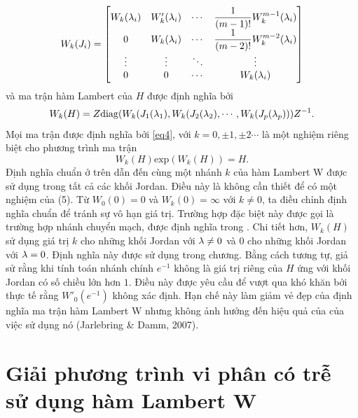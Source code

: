 \begin{equation}\label{eq3}
	W_k(J_i)= \begin{bmatrix}
		W_k(\lambda_i)  & W'_k(\lambda_i) & \cdots & \dfrac{1}{(m-1)!} W_k ^{m-1}(\lambda_i)\\
		0 & W_k(\lambda_i) & \cdots & \dfrac{1}{(m-2)!} W_k ^{m-2}(\lambda_i)\\
		\vdots  & \vdots  & \ddots & \vdots  \\
		0 & 0 & \cdots & W_k(\lambda_i)
	\end{bmatrix} 
\end{equation}
và ma trận hàm Lambert của $H$ được định nghĩa bởi
\begin{equation}\label{eq4}
	W_k(H)= Z \mathrm{diag} (W_k(J_1(\lambda_1),W_k(J_2(\lambda_2), \cdots , W_k(J_p(\lambda_p) ))Z^{-1}.
\end{equation}
Mọi ma trận được định nghĩa bởi \eqref{eq4}, với $k = 0, \pm 1, \pm 2 \cdots$ là một nghiệm riêng biệt cho phương trình ma trận 
\begin{equation}\label{eq5}
	W_k(H) \mathrm{exp}	(W_k(H)) = H.
\end{equation}		
Định nghĩa chuẩn ở trên dẫn đến cùng một nhánh $k$ của hàm Lambert W được sử dụng trong tất cả các khối Jordan. Điều này là không cần thiết để có một nghiệm của (5). Từ $W_0(0)= 0$ và $W_k(0) = \infty$ với $k \ne 0$, ta điều chỉnh định nghĩa chuẩn để tránh sự vô hạn giá trị. Trường hợp đặc biệt này được gọi là trường hợp nhánh chuyển mạch, được định nghĩa trong \cite{Yi08,Yi10} . Chi tiết hơn, $W_k(H)$ sử dụng giá trị $k$ cho những khối Jordan với $\lambda \ne 0$ và $0$ cho những khối Jordan với $\lambda = 0$. Định nghĩa này được sử dụng trong chương.
Bằng cách tương tự, giả sử rằng khi tính toán nhánh chính $e ^{-1}$ không là giá trị riêng của $H$ ứng với khối Jordan có số chiều lớn hơn $1$. Điều này được yêu cầu để vượt qua khó khăn bởi thực tế rằng $W'_0(e ^{-1})$ không xác định. Hạn chế này làm giảm vẻ đẹp của định nghĩa ma trận hàm Lambert W nhưng không ảnh hưởng đến hiệu quả của của việc sử dụng nó (Jarlebring \& Damm, 2007).



\section{Giải phương trình vi phân có trễ sử dụng hàm Lambert W}
